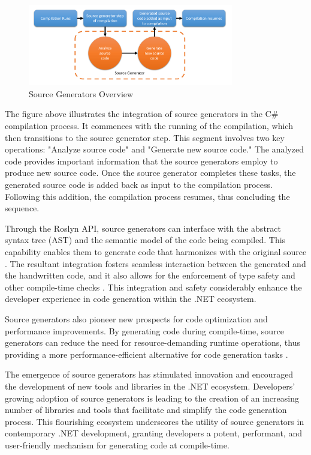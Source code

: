 \begin{figure}[H]
\centering
\includegraphics[width=0.8\textwidth]{graphics/source-generator-visualization.png}
\caption{Source Generators Overview}
\label{fig:source_generators_workflow}
\end{figure}

The figure above illustrates the integration of source generators in the C\# compilation process. It commences with the running of the compilation, which then transitions to the source generator step. This segment involves two key operations: "Analyze source code" and "Generate new source code." The analyzed code provides important information that the source generators employ to produce new source code. Once the source generator completes these tasks, the generated source code is added back as input to the compilation process. Following this addition, the compilation process resumes, thus concluding the sequence.

Through the Roslyn API, source generators can interface with the abstract syntax tree (AST) and the semantic model of the code being compiled. This capability enables them to generate code that harmonizes with the original source \cite{CSharpRoslyn}. The resultant integration fosters seamless interaction between the generated and the handwritten code, and it also allows for the enforcement of type safety and other compile-time checks \cite{Carter2020}. This integration and safety considerably enhance the developer experience in code generation within the .NET ecosystem.

Source generators also pioneer new prospects for code optimization and performance improvements. By generating code during compile-time, source generators can reduce the need for resource-demanding runtime operations, thus providing a more performance-efficient alternative for code generation tasks \cite{CSharpRoslyn}.

The emergence of source generators has stimulated innovation and encouraged the development of new tools and libraries in the .NET ecosystem. Developers' growing adoption of source generators is leading to the creation of an increasing number of libraries and tools that facilitate and simplify the code generation process. This flourishing ecosystem underscores the utility of source generators in contemporary .NET development, granting developers a potent, performant, and user-friendly mechanism for generating code at compile-time.

